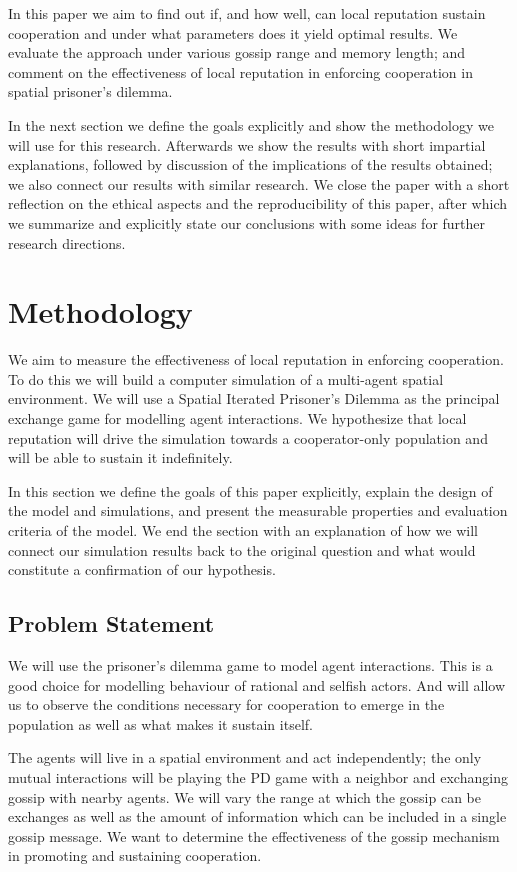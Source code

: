 \documentclass[english]{article}
\begin{document}
In this paper we aim to find out if, and how well, can local reputation sustain cooperation and under what parameters does it yield optimal results.
We evaluate the approach under various gossip range and memory length; and comment on the effectiveness of local reputation in enforcing cooperation in spatial prisoner's dilemma.

In the next section we define the goals explicitly and show the methodology we will use for this research.
Afterwards we show the results with short impartial explanations, followed by discussion of the implications of the results obtained;
we also connect our results with similar research.
We close the paper with a short reflection on the ethical aspects and the reproducibility of this paper,
after which we summarize and explicitly state our conclusions with some ideas for further research directions.


\section{Methodology}
We aim to measure the effectiveness of local reputation in enforcing cooperation.
To do this we will build a computer simulation of a multi-agent spatial environment.
We will use a Spatial Iterated Prisoner's Dilemma as the principal exchange game for modelling agent interactions.
We hypothesize that local reputation will drive the simulation towards a cooperator-only population and will be able to sustain it indefinitely.

In this section we define the goals of this paper explicitly,
explain the design of the model and simulations,
and present the measurable properties and evaluation criteria of the model.
We end the section with an explanation of how we will connect our simulation results back to the original question
and what would constitute a confirmation of our hypothesis.

\subsection{Problem Statement}
We will use the prisoner's dilemma game to model agent interactions.
This is a good choice for modelling behaviour of rational and selfish actors.
And will allow us to observe the conditions necessary for cooperation to emerge in the population as well as what makes it sustain itself.

The agents will live in a spatial environment and act independently;
the only mutual interactions will be playing the PD game with a neighbor and exchanging gossip with nearby agents.
We will vary the range at which the gossip can be exchanges as well as the amount of information which can be included in a single gossip message.
We want to determine the effectiveness of the gossip mechanism in promoting and sustaining cooperation.
\end{document}
